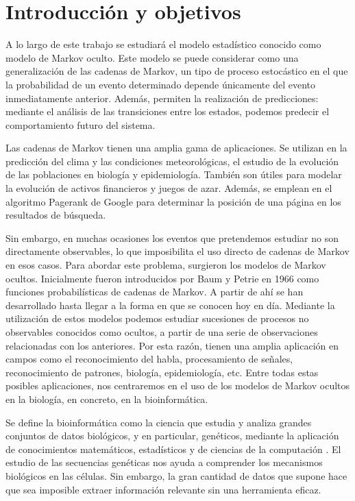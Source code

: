 \chapter*{Introducción y objetivos}

A lo largo de este trabajo se estudiará el modelo estadístico conocido como modelo de Markov oculto. Este modelo se puede considerar como una generalización de las cadenas de Markov, un tipo de proceso estocástico en el que la probabilidad de un evento determinado depende únicamente del evento inmediatamente anterior. Además, permiten la realización de predicciones: mediante el análisis de las transiciones entre los estados, podemos predecir el comportamiento futuro del sistema. 

Las cadenas de Markov tienen una amplia gama de aplicaciones. Se utilizan en la predicción del clima y las condiciones meteorológicas, el estudio de la evolución de las poblaciones en biología y epidemiología. También son útiles para modelar la evolución de activos financieros y juegos de azar. Además, se emplean en el algoritmo Pagerank de Google para determinar la posición de una página en los resultados de búsqueda.

Sin embargo, en muchas ocasiones los eventos que pretendemos estudiar no son directamente observables, lo que imposibilita el uso directo de cadenas de Markov en esos casos. Para abordar este problema, surgieron los modelos de Markov ocultos. Inicialmente fueron introducidos por Baum y Petrie en 1966 \cite{Baum} como funciones probabilísticas de cadenas de Markov. A partir de ahí se han desarrollado hasta llegar a la forma en que se conocen hoy en día. Mediante la utilización de estos modelos podemos estudiar sucesiones de procesos no observables conocidos como ocultos, a partir de una serie de observaciones relacionadas con los anteriores. Por esta razón, tienen una amplia aplicación en campos como el reconocimiento del habla, procesamiento de señales, reconocimiento de patrones, biología, epidemiología, etc. Entre todas estas posibles aplicaciones, nos centraremos en el uso de los modelos de Markov ocultos en la biología, en concreto, en la bioinformática. 

Se define la bioinformática como la ciencia que estudia y analiza grandes conjuntos de datos biológicos, y en particular, genéticos, mediante la aplicación de conocimientos matemáticos, estadísticos y de ciencias de la computación \cite{Warren}. El estudio de las secuencias genéticas nos ayuda a comprender los mecanismos biológicos en las células. Sin embargo, la gran cantidad de datos que supone hace que sea imposible extraer información relevante sin una herramienta eficaz. 


